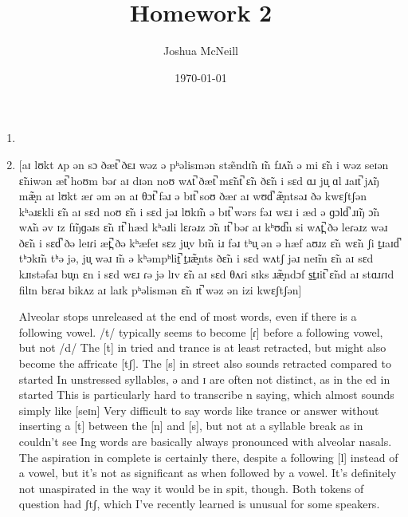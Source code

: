 \documentclass{article}
\author{Joshua McNeill}
\title{Homework 2}
\date{\today}
\begin{document}
  \maketitle
  \begin{enumerate}
    \item
    \item {[}aɪ lʊkt ʌp ən sɔ ðæt̚ ðɛɹ wəz ə pʰəlismən stæ̃ndɪ̃n ɪ̃n fɹʌ̃n ə mi ɛ̃n i wəz seɪən ɛ̃niwən æt̚ hoʊm bəɾ aɪ dɪən noʊ wʌt̚ ðæt̚ mɛ̃nt̚ ɛ̃n ðɛ̃n i sɛd ɑɹ ju̟ ɑl ɹaɪt̚ jʌ̃ŋ mæ̝̃n aɪ lʊkt æɾ əm ən aɪ θɔt̚ fəɹ ə bɪt̚ soʊ ðæɾ aɪ wʊd̚ æ̝̃ntsəɹ ðə kwɛʃtʃən kʰəɹɛkli ɛ̃n aɪ sɛd noʊ ɛ̃n i sɛd jəɹ lʊkɪ̃n ə bɪt̚ wərs fəɹ wɛɹ i æd ə ɡɔld̚ ɹɪ̃ŋ ɔ̃n wʌ̃n əv ɪz fɪ̃ŋɡəɹs ɛ̃n ɪt̚ hæd kʰəɹli lɛɾəɹz ɔ̃n ɪt̚ bəɾ aɪ kʰʊd̚n si wʌt̪̚ ðə leɾəɹz wəɹ ðɛ̃n i sɛd̚ ðə leɪɾi æt̪̚ ðə kʰæfeɪ sɛz ju̟v bɪ̃n iɹ fəɹ tʰu̟ ən ə hæf aʊɹz ɛ̃n wɛ̃n ʃi t̠ɹaɪd̚ tʰɔkɪ̃n tʰə jə, ju̟ wəɹ ɪ̃n ə kʰəmpʰlit̠̚ t̠ɹæ̝̃nts ðɛ̃n i sɛd wʌtʃ jəɹ neɪ̃m ɛ̃n aɪ sɛd kɹɪstəfəɹ bu̟n ɛn i sɛd wɛɹ ɾə jə lɪv ɛ̃n aɪ sɛd θʌɾi sɪks ɹæ̝̃ndɔf s̠t̠ɹit̚ ɛ̃nd aɪ stɑɹɾɪd filɪn bɛɾəɹ bikʌz aɪ laɪk pʰəlismən ɛ̃n ɪt̚ wəz ən izi kwɛʃtʃən]

    Alveolar stops unreleased at the end of most words, even if there is a following vowel. /t/ typically seems to become [ɾ] before a following vowel, but not /d/
    The [t] in tried and trance is at least retracted, but might also become the affricate [tʃ].
      The [s] in street also sounds retracted compared to started
        In unstressed syllables, ə and ɪ are often not distinct, as in the ed in started
          This is particularly hard to transcribe n saying, which almost sounds simply like [seɪn]
    Very difficult to say words like trance or answer without inserting a [t] between the [n] and [s], but not at a syllable break as in couldn't see
    Ing words are basically always pronounced with alveolar nasals.
    The aspiration in complete is certainly there, despite a following [l] instead of a vowel, but it's not as significant as when followed by a vowel. It's definitely not unaspirated in the way it would be in spit, though.
    Both tokens of question had ʃtʃ, which I've recently learned is unusual for some speakers.
  \end{enumerate}
\end{document}
